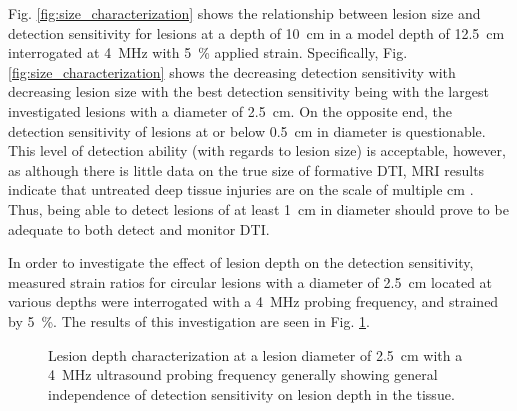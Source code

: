 			Fig. \ref{fig:size_characterization} shows the relationship between lesion size and detection sensitivity for lesions at a depth of \SI{10}{cm} in a model depth of \SI{12.5}{cm} interrogated at \SI{4}{MHz} with \SI{5}{\percent} applied strain. Specifically, Fig. \ref{fig:size_characterization} shows the decreasing detection sensitivity with decreasing lesion size with the best detection sensitivity being with the largest investigated lesions with a diameter of \SI{2.5}{cm}. On the opposite end, the detection sensitivity of lesions at or below \SI{0.5}{cm} in diameter is questionable. This level of detection ability (with regards to lesion size) is acceptable, however, as although there is little data on the true size of formative DTI, MRI results indicate that untreated deep tissue injuries are on the scale of multiple cm \cite{solis13}. Thus, being able to detect lesions of at least \SI{1}{cm} in diameter should prove to be adequate to both detect and monitor DTI. 

			In order to investigate the effect of lesion depth on the detection sensitivity, measured strain ratios for circular lesions with a diameter of \SI{2.5}{cm} located at various depths were interrogated with a \SI{4}{MHz} probing frequency, and strained by \SI{5}{\percent}. The results of this investigation are seen in Fig. \ref{fig:depth_characterization}.

			\begin{figure}[!t]
				\centering
				\caption[Lesion depth characterization]{Lesion depth characterization at a lesion diameter of \SI{2.5}{cm} with a \SI{4}{MHz} ultrasound probing frequency generally showing general independence of detection sensitivity on lesion depth in the tissue.}
				\label{fig:depth_characterization}
			\end{figure}

